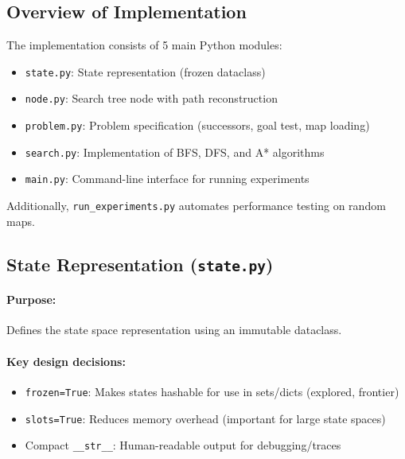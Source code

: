 \documentclass[11pt,a4paper]{article}
\begin{document}
\subsection{Overview of Implementation}
The implementation consists of 5 main Python modules:
\begin{itemize}[leftmargin=1.5cm,itemsep=0.1em]
    \item \texttt{state.py}: State representation (frozen dataclass)
    \item \texttt{node.py}: Search tree node with path reconstruction
    \item \texttt{problem.py}: Problem specification (successors, goal test, map loading)
    \item \texttt{search.py}: Implementation of BFS, DFS, and A* algorithms
    \item \texttt{main.py}: Command-line interface for running experiments
\end{itemize}

\noindent Additionally, \texttt{run\_experiments.py} automates performance testing on random maps.

\subsection{State Representation (\texttt{state.py})}

\paragraph{Purpose:} Defines the state space representation using an immutable dataclass.

\paragraph{Key design decisions:}
\begin{itemize}[leftmargin=1.5cm,itemsep=0.1em]
    \item \texttt{frozen=True}: Makes states hashable for use in sets/dicts (explored, frontier)
    \item \texttt{slots=True}: Reduces memory overhead (important for large state spaces)
    \item Compact \texttt{\_\_str\_\_}: Human-readable output for debugging/traces
\end{itemize}


\end{document}
